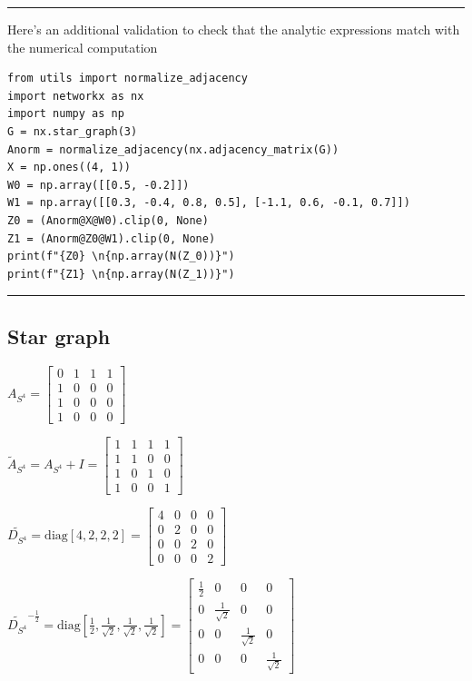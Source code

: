 \documentclass[a4paper]{article}
\begin{document}
\hrule
Here's an additional validation to check that the analytic expressions match with the numerical computation
\begin{verbatim}
from utils import normalize_adjacency
import networkx as nx
import numpy as np
G = nx.star_graph(3)
Anorm = normalize_adjacency(nx.adjacency_matrix(G))
X = np.ones((4, 1))
W0 = np.array([[0.5, -0.2]])
W1 = np.array([[0.3, -0.4, 0.8, 0.5], [-1.1, 0.6, -0.1, 0.7]])
Z0 = (Anorm@X@W0).clip(0, None)
Z1 = (Anorm@Z0@W1).clip(0, None)
print(f"{Z0} \n{np.array(N(Z_0))}")
print(f"{Z1} \n{np.array(N(Z_1))}")
\end{verbatim}
\hrule

\break
\subsection*{Star graph}

    
$ A_{S^4} = \begin{bmatrix}
    0  &  1  &  1  &  1 \\
    1  &  0  &  0  &  0 \\
    1  &  0  &  0  &  0 \\
    1  &  0  &  0  &  0 
\end{bmatrix}
$

$\tilde{A}_{S^4} = A_{S^4} + I = \begin{bmatrix}
    1  &  1  &  1  &  1 \\
    1  &  1  &  0  &  0 \\
    1  &  0  &  1  &  0 \\
    1  &  0  &  0  &  1 
  \end{bmatrix}
$

$ \tilde{D_{S^4}} = \text{diag}[4, 2, 2, 2] = \begin{bmatrix}
    4  &  0  &  0  &  0 \\
    0  &  2  &  0  &  0 \\
    0  &  0  &  2  &  0 \\
    0  &  0  &  0  &  2 
\end{bmatrix}$


$\tilde{D_{S^4}}^{-\frac{1}{2}} = \text{diag}[\frac{1}{2}, \frac{1}{\sqrt{2}}, \frac{1}{\sqrt{2}}, \frac{1}{\sqrt{2}}] = 
\begin{bmatrix}
    \frac{1}{2}  &  0  &  0  &  0 \\
    0  &  \frac{1}{\sqrt{2}}  &  0  &  0 \\
    0  &  0  &  \frac{1}{\sqrt{2}}  &  0 \\
    0  &  0  &  0  &  \frac{1}{\sqrt{2}} 
\end{bmatrix}$
\end{document}
